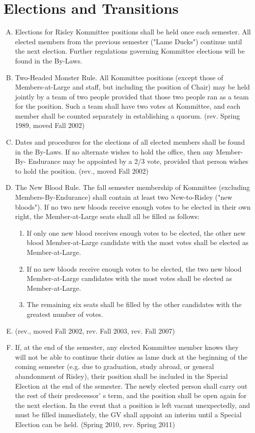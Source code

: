 \documentclass[12pt]{article}
\begin{document}
\section{Elections and Transitions}
\begin{enumerate}[A.]
\item Elections for Risley Kommittee positions shall be held once each semester. All elected members from the previous semester ("Lame Ducks") continue until the next election. Further regulations governing Kommittee elections will be found in the By-Laws.
\item Two-Headed Monster Rule. All Kommittee positions (except those of Members-at-Large and staff, but including the position of Chair) may be held jointly by a team of two people provided that those two people ran as a team for the position. Such a team shall have two votes at Kommittee, and each member shall be counted separately in establishing a quorum. (rev. Spring 1989, moved Fall 2002)
\item Dates and procedures for the elections of all elected members shall be found in the By-Laws. If no alternate wishes to hold the office, then any Member-By- Endurance may be appointed by a 2/3 vote, provided that person wishes to hold the position. (rev., moved Fall 2002)
\item The New Blood Rule. The fall semester membership of Kommittee (excluding Members-By-Endurance) shall contain at least two New-to-Risley ("new bloods"). If no two new bloods receive enough votes to be elected in their own right, the Member-at-Large seats shall all be filled as follows:
\begin{enumerate}[1.]
\item If only one new blood receives enough votes to be elected, the other new blood Member-at-Large candidate with the most votes shall be elected as Member-at-Large.
\item If no new bloods receive enough votes to be elected, the two new blood Member-at-Large candidates with the most votes shall be elected as Member-at-Large.
\item The remaining six seats shall be filled by the other candidates with the greatest number of votes.
\end{enumerate}
\item (rev., moved Fall 2002, rev. Fall 2003, rev. Fall 2007)
\item If, at the end of the semester, any elected Kommittee member knows they will not be able to continue their duties as lame duck at the beginning of the coming semester (e.g. due to graduation, study abroad, or general abandonment of Risley), their position shall be included in the Special Election at the end of the semester. The newly elected person shall carry out the rest of their predecessor’ s term, and the position shall be open again for the next election. In the event that a position is left vacant unexpectedly, and must be filled immediately, the GV shall appoint an interim until a Special Election can be held. (Spring 2010, rev. Spring 2011)
\end{enumerate}
\end{document}
